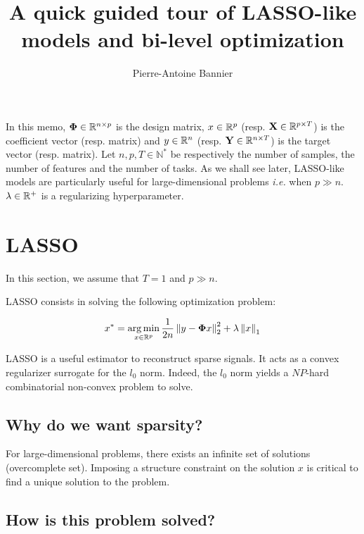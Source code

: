 \documentclass[a4paper,10pt]{article}
\author{Pierre-Antoine Bannier}
\title{A quick guided tour of LASSO-like models and bi-level optimization}
\theoremstyle{definition}
\begin{document}
\maketitle

\vskip 0.3in

In this memo, $\mathbf{\Phi} \in \mathbb{R}^{n \times p}$ is the design matrix, $x \in \mathbb{R}^{p}$ (resp. $\mathbf{X} \in \mathbb{R}^{p \times T}$) is the coefficient vector (resp. matrix) and $y \in \mathbb{R}^n$
(resp. $\mathbf{Y} \in \mathbb{R}^{n \times T}$) is the target vector (resp. matrix). Let $n, p, T \in \mathbb{N}^*$ be respectively the number of samples, the number of features and the number of tasks. As we shall see later, LASSO-like models
are particularly useful for large-dimensional problems \textit{i.e.} when $p \gg n$. $\lambda \in \mathbb{R}^+$ is a regularizing hyperparameter.

\section{LASSO}
\label{section_1}

In this section, we assume that $T = 1$ and $p \gg n$.

\vskip 0.2in

LASSO consists in solving the following optimization problem:

\begin{equation*}
    x^* = \operatorname*{arg\,min}_{x \in \mathbb{R}^{p}} \frac{1}{2n}\left \lVert  y - \mathbf{\Phi} x \right \rVert_2^2 + \lambda \left \lVert  x \right \rVert_{1}
\end{equation*}

\vskip 0.1in

LASSO is a useful estimator to reconstruct sparse signals. It acts as a convex regularizer surrogate for the $l_0$ norm. Indeed, the
$l_0$ norm yields a $NP$-hard combinatorial non-convex problem to solve. \\

\subsection*{Why do we want sparsity?}

For large-dimensional problems, there exists an infinite set of solutions (overcomplete set).
Imposing a structure constraint on the solution $x$ is critical to find a unique solution to the problem.

\subsection*{How is this problem solved?}
\end{document}
